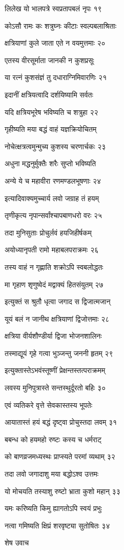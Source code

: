 लिलेख यो भालपत्रे स्वप्रतापबलं नृपः १९

कोऽसौ रामः कः शत्रुघ्नः कीटाः स्वल्पबलाश्रिताः

क्षत्रियाणां कुले जाता एते न वयमुत्तमाः २०

एतस्य वीरसूर्माता जानकी न कुशप्रसूः

या रत्नं कुशसंज्ञं तु दधाराग्निमिवारणिः २१

इदानीं क्षत्रियत्वादि दर्शयिष्यामि सर्वतः

यदि क्षत्रियभूरेष भविष्यति च शत्रुहा २२

गृहीष्यति मया बद्धं वाहं यज्ञक्रियोचितम्

नोचेत्क्षत्रत्वमुन्मुच्य कुशस्य चरणार्चकः २३

अधुना मद्धनुर्मुक्तैः शरैः सुप्तो भविष्यति

अन्ये ये च महावीरा रणमण्डलभूषणाः २४

इत्यादिवाक्यमुच्चार्य लवो जग्राह तं हयम्

तृणीकृत्य नृपान्सर्वांश्चापबाणधरो वरः २५

तदा मुनिसुताः प्रोचुर्लवं हयजिहीर्षकम्

अयोध्यानृपती रामो महाबलपराक्रमः २६

तस्य वाहं न गृह्णाति शक्रोऽपि स्वबलोद्धतः

मा गृहाण शृणुष्वेदं मद्वाक्यं हितसंयुतम् २७

इत्युक्तं स श्रुतौ धृत्वा जगाद स द्विजात्मजान्

यूयं बलं न जानीथ क्षत्रियाणां द्विजोत्तमाः २८

क्षत्रिया वीर्यशौण्डीर्या द्विजा भोजनशालिनः

तस्माद्यूयं गृहे गत्वा भुञ्जन्तु जननी हृतम् २९

इत्युक्तास्तेऽभवंस्तूष्णीं प्रेक्षन्तस्तत्पराक्रमम्

लवस्य मुनिपुत्रास्ते सन्तस्थुर्दूरतो बहिः ३०

एवं व्यतिकरे वृत्ते सेवकास्तस्य भूपतेः

आयातास्तं हयं बद्धं दृष्ट्वा प्रोचुस्तदा लवम् ३१

बबन्ध को हयमहो रुष्टः कस्य च धर्मराट्

को बाणव्रजमध्यस्थः प्राप्स्यते परमां व्यथाम् ३२

तदा लवो जगादाशु मया बद्धोऽश्व उत्तमः

यो मोचयति तस्याशु रुष्टो भ्राता कुशो महान् ३३

यमः करिष्यति किमु ह्यागतोऽपि स्वयं प्रभुः

नत्वा गमिष्यति क्षिप्रं शरवृष्ट्या सुतोषितः ३४

शेष उवाच

